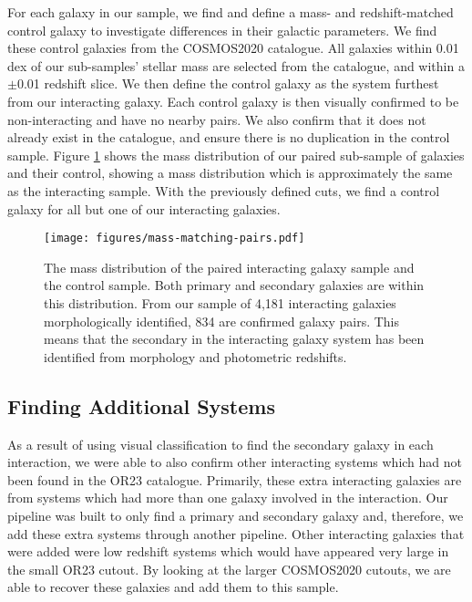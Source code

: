 \documentclass[fleqn,usenatbib]{mnras}
\begin{document}
For each galaxy in our sample, we find and define a mass- and redshift-matched control galaxy to investigate differences in their galactic parameters. We find these control galaxies from the COSMOS2020 catalogue. All galaxies within 0.01 dex of our sub-samples' stellar mass are selected from the catalogue, and within a $\pm$0.01 redshift slice. We then define the control galaxy as the system furthest from our interacting galaxy. Each control galaxy is then visually confirmed to be non-interacting and have no nearby pairs. We also confirm that it does not already exist in the catalogue, and ensure there is no duplication in the control sample. Figure \ref{fig:matched-distributions} shows the mass distribution of our paired sub-sample of galaxies and their control, showing a mass distribution which is approximately the same as the interacting sample. With the previously defined cuts, we find a control galaxy for all but one of our interacting galaxies.

\begin{figure}
    \centering
    \texttt{[image: figures/mass-matching-pairs.pdf]}
    \caption{The mass distribution of the paired interacting galaxy sample and the control sample. Both primary and secondary galaxies are within this distribution. From our sample of 4,181 interacting galaxies morphologically identified, 834 are confirmed galaxy pairs. This means that the secondary in the interacting galaxy system has been identified from morphology and photometric redshifts.}
    \label{fig:matched-distributions}
\end{figure}

\subsection{Finding Additional Systems}
\noindent As a result of using visual classification to find the secondary galaxy in each interaction, we were able to also confirm other interacting systems which had not been found in the OR23 catalogue. Primarily, these extra interacting galaxies are from systems which had more than one galaxy involved in the interaction. Our pipeline was built to only find a primary and secondary galaxy and, therefore, we add these extra systems through another pipeline. Other interacting galaxies that were added were low redshift systems which would have appeared very large in the small OR23 cutout. By looking at the larger COSMOS2020 cutouts, we are able to recover these galaxies and add them to this sample.
\end{document}

